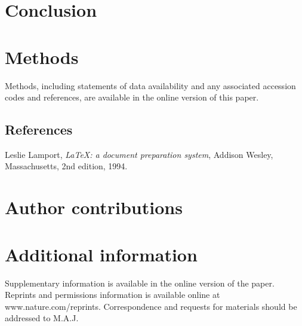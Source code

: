 \documentclass[twocolumn, linenumbers, superscriptaddress]{revtex4-1}
\begin{document}
	\section*{Conclusion}
		\blindtext[3]

	\section*{Methods}
		Methods, including statements of data availability and any associated accession codes and references, are available in the online version of this paper.
	
	\begin{thebibliography}{50}
		\section*{References}	
			Leslie Lamport,
			\textit{\LaTeX: a document preparation system},
			Addison Wesley, Massachusetts,
			2nd edition,
			1994.

	\end{thebibliography}

	\begin{acknowledgements}
		\blindtext
	\end{acknowledgements}

	\section*{Author contributions}
		\blindtext
	
	\section*{Additional information}
		Supplementary information is available in the online version of the paper.
		Reprints and permissions information is available online at www.nature.com/reprints.
		Correspondence and requests for materials should be addressed to M.A.J.
	
\end{document}
